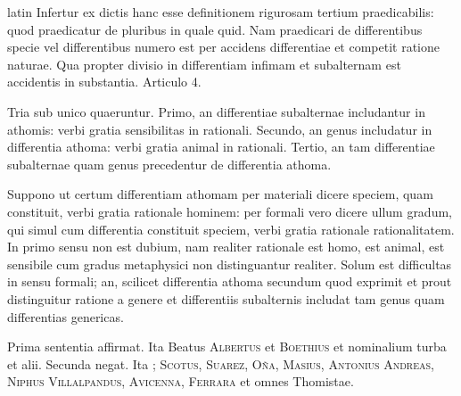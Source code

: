\begin{otherlanguage*}{latin}
\pstart
 Infertur ex dictis hanc esse definitionem rigurosam tertium praedicabilis: quod praedicatur de pluribus in quale quid. Nam praedicari de differentibus specie vel differentibus numero est per accidens differentiae et competit ratione naturae. Qua propter divisio in differentiam infimam et subalternam est accidentis in substantia. Articulo 4. 
\pend

        \pstart
        \pend
      
\pstart
 Tria sub unico quaeruntur. Primo, an differentiae subalternae includantur in athomis: verbi gratia sensibilitas in rationali. Secundo, an genus includatur in differentia athoma: verbi gratia animal in rationali. Tertio, an tam differentiae subalternae quam genus precedentur de differentia athoma. 
\pend

\pstart
 Suppono ut certum differentiam athomam per materiali dicere speciem, quam constituit, verbi gratia rationale hominem: per formali vero dicere ullum gradum, qui simul cum differentia constituit speciem, verbi gratia rationale rationalitatem. In primo sensu non est dubium, nam realiter rationale est homo, est animal, est sensibile cum gradus metaphysici non distinguantur realiter. Solum est difficultas in sensu formali; an, scilicet differentia athoma secundum quod exprimit et prout distinguitur ratione a genere et differentiis subalternis includat tam genus quam differentias genericas. 
\pend

\pstart
 Prima sententia affirmat. Ita  Beatus \textsc{Albertus} et \textsc{Boethius} et nominalium turba et alii. Secunda negat. Ita ; \textsc{Scotus}, \textsc{Suarez}, \textsc{Oña}, \textsc{Masius}, \textsc{Antonius Andreas}, \textsc{Niphus} \textsc{Villalpandus}, \textsc{Avicenna}, \textsc{Ferrara} et omnes Thomistae. 
\pend


\end{otherlanguage*}
